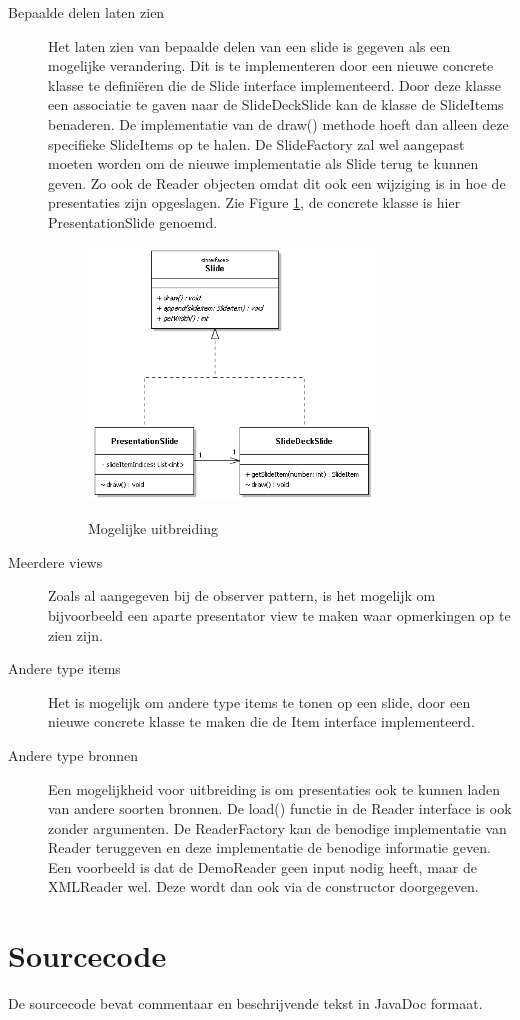 \documentclass[a4paper]{article}
\begin{document}
\begin{description}
\item[Bepaalde delen laten zien] Het laten zien van bepaalde delen van een slide is gegeven als een mogelijke verandering. Dit is te implementeren door een nieuwe concrete klasse te definiëren die de Slide interface implementeerd. Door deze klasse een associatie te gaven naar de SlideDeckSlide kan de klasse de SlideItems benaderen. De implementatie van de draw() methode hoeft dan alleen deze specifieke SlideItems op te halen. De SlideFactory zal wel aangepast moeten worden om de nieuwe implementatie als Slide terug te kunnen geven. Zo ook de Reader objecten omdat dit ook een wijziging is in hoe de presentaties zijn opgeslagen. Zie Figure \ref{fig:mogelijkeuitbreiding}, de concrete klasse is hier PresentationSlide genoemd.
\begin{figure}[htbp]
\caption{Mogelijke uitbreiding}
\centering
\includegraphics[width=0.75\textwidth]{MogelijkeUitbreiding.PNG}
\label{fig:mogelijkeuitbreiding}
\end{figure}
\item[Meerdere views] Zoals al aangegeven bij de observer pattern, is het mogelijk om bijvoorbeeld een aparte presentator view te maken waar opmerkingen op te zien zijn.
\item[Andere type items] Het is mogelijk om andere type items te tonen op een slide, door een nieuwe concrete klasse te maken die de Item interface implementeerd.
\item[Andere type bronnen] Een mogelijkheid voor uitbreiding is om presentaties ook te kunnen laden van andere soorten bronnen. De load() functie in de Reader interface is ook zonder argumenten. De ReaderFactory kan de benodige implementatie van Reader teruggeven en deze implementatie de benodige informatie geven. Een voorbeeld is dat de DemoReader geen input nodig heeft, maar de XMLReader wel. Deze wordt dan ook via de constructor doorgegeven.
\end{description}


\section{Sourcecode}
De sourcecode bevat commentaar en beschrijvende tekst in JavaDoc formaat.
\end{document}
